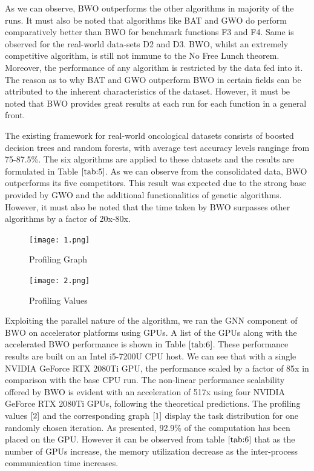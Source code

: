 \documentclass[conference]{IEEEtran}
\theoremstyle{definition}
\begin{document}
As we can observe, BWO outperforms the other algorithms in majority of the runs. It must also be noted that algorithms like BAT and GWO do perform comparatively better than BWO for benchmark functions F3 and F4. Same is observed for the real-world data-sets D2 and D3. BWO, whilst an extremely competitive algorithm, is still not immune to the No Free Lunch theorem. Moreover, the performance of any algorithm is restricted by the data fed into it. The reason as to why BAT and GWO outperform BWO in certain fields can be attributed to the inherent characteristics of the dataset. However, it must be noted that BWO provides great results at each run for each function in a general front. 

The existing framework for real-world oncological datasets consists of boosted decision trees and random forests, with average test accuracy levels ranginge from 75-87.5\%. The six algorithms are applied to these datasets and the results are formulated in Table $\ref{tab:5}$. As we can observe from the consolidated data, BWO outperforms its five competitors. This result was expected due to the strong base provided by GWO and the additional functionalities of genetic algorithms. However, it must also be noted that the time taken by BWO surpasses other algorithms by a factor of 20x-80x. 

\begin{figure}[t]
\centering\texttt{[image: 1.png]}
\caption{Profiling Graph}
\label{1}    
\end{figure}

\begin{figure}[t]
\centering\texttt{[image: 2.png]}
\caption{Profiling Values}
\label{2}    
\end{figure}

Exploiting the parallel nature of the algorithm, we ran the GNN component of BWO on accelerator platforms using GPUs. A list of the GPUs along with the accelerated BWO performance is shown in Table $\ref{tab:6}$. These performance results are built on an Intel i5-7200U CPU host. We can see that with a single NVIDIA GeForce RTX 2080Ti GPU, the performance scaled by a factor of 85x in comparison with the base CPU run. The non-linear performance scalability offered by BWO is evident with an acceleration of 517x using four NVIDIA GeForce RTX 2080Ti GPUs, following the theoretical predictions. The profiling values $\ref{2}$ and the corresponding graph $\ref{1}$ display the task distribution for one randomly chosen iteration. As presented, 92.9\% of the computation has been placed on the GPU. However it can be observed from table $\ref{tab:6}$ that as the number of GPUs increase, the memory utilization decrease as the inter-process communication time increases.  
\end{document}
